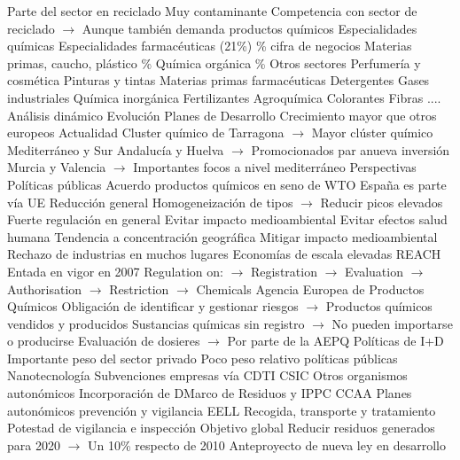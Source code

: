 \documentclass{nuevotema}
\begin{document}
\begin{esquemal}
				\4[] Parte del sector en reciclado
				\4[] Muy contaminante
				\4[] Competencia con sector de reciclado
				\4[] $\to$ Aunque también demanda productos químicos
			\3 Especialidades químicas
				\4 Especialidades farmacéuticas (21\%)
				\% cifra de negocios
				\4 Materias primas, caucho, plástico
				\%
				\4 Química orgánica
				\%
				\4 Otros sectores
				\4[] Perfumería y cosmética
				\4[] Pinturas y tintas
				\4[] Materias primas farmacéuticas
				\4[] Detergentes
				\4[] Gases industriales
				\4[] Química inorgánica
				\4[] Fertilizantes
				\4[] Agroquímica
				\4[] Colorantes
				\4[] Fibras
				\4[] ....
		\2 Análisis dinámico
			\3 Evolución
				\4[] Planes de Desarrollo
				\4[] Crecimiento mayor que otros europeos
			\3 Actualidad
				\4[] Cluster químico de Tarragona
				\4[] $\to$ Mayor clúster químico Mediterráneo y Sur
				\4[] Andalucía y Huelva
				\4[] $\to$ Promocionados par anueva inversión
				\4[] Murcia y Valencia
				\4[] $\to$ Importantes focos a nivel mediterráneo
			\3 Perspectivas
		\2 Políticas públicas
			\3 Acuerdo productos químicos en seno de WTO
				\4 España es parte vía UE
				\4 Reducción general
				\4 Homogeneización de tipos
				\4[] $\to$ Reducir picos elevados
			\3 Fuerte regulación en general
				\4 Evitar impacto medioambiental
				\4 Evitar efectos salud humana
			\3 Tendencia a concentración geográfica
				\4 Mitigar impacto medioambiental
				\4 Rechazo de industrias en muchos lugares
				\4 Economías de escala elevadas
			\3 REACH
				\4 Entada en vigor en 2007
				\4[] Regulation on:
				\4[] $\to$ Registration
				\4[] $\to$ Evaluation
				\4[] $\to$ Authorisation
				\4[] $\to$ Restriction
				\4[] $\to$ Chemicals
				\4 Agencia Europea de Productos Químicos
				\4 Obligación de identificar y gestionar riesgos
				\4[] $\to$ Productos químicos vendidos y producidos
				\4 Sustancias químicas sin registro
				\4[] $\to$ No pueden importarse o producirse
				\4 Evaluación de dosieres
				\4[] $\to$ Por parte de la AEPQ
			\3 Políticas de I+D
				\4 Importante peso del sector privado
				\4 Poco peso relativo políticas públicas
			\3 Nanotecnología
				\4 Subvenciones empresas vía CDTI
				\4 CSIC
				\4 Otros organismos autonómicos
			\3 Incorporación de DMarco de Residuos y IPPC
				\4 CCAA
				\4[] Planes autonómicos prevención y vigilancia
				\4 EELL
				\4[] Recogida, transporte y tratamiento
				\4[] Potestad de vigilancia e inspección
				\4 Objetivo global
				\4[] Reducir residuos generados para 2020
				\4[] $\to$ Un 10\% respecto de 2010
				\4 Anteproyecto de nueva ley en desarrollo

\end{esquemal}
\end{document}
